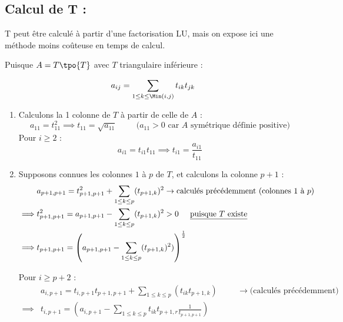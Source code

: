 \subsection*{Calcul de T :}

T peut être calculé à partir d'une factorisation LU, mais on expose ici une méthode moins coûteuse en temps de calcul.

Puisque $A = T \tpo{T}$ avec $T$ triangulaire inférieure :

\[
    a_{ij} = \sum_{1 \leq k \leq \Min(i,j)} t_{ik} t_{jk}
\]

\begin{enumerate}[label=-]
    \item Calculons la 1 colonne de $T$ à partir de celle de $A$ :
        \[
            a_{11} = t_{11}^2 \implies t_{11} = \sqrt{a_{11}} \hspace{1cm} 
            \text{($a_{11} > 0$ car $A$ symétrique définie positive)}
        \]
        Pour $i \geq 2$ :
        \[
            a_{i1} = t_{i1} t_{11} \implies t_{i1} = \frac{a_{i1}}{t_{11}}
        \]
    \item Supposons connues les colonnes $1$ à $p$ de $T$, et calculons la colonne $p+1$ :
        \begin{align*}
            & a_{p+1,p+1} = t_{p+1,p+1}^2 + \sum_{1 \leq k \leq p}(t_{p+1,k})^2 \to
            \text{calculés précédemment (colonnes 1 à $p$)} \\
            \implies & t_{p+1,p+1}^2 = a_{p+1,p+1} - \sum_{1 \leq k \leq p}(t_{p+1,k})^2 > 0 \hspace{0.5cm} \text{\underline{puisque $T$ existe}} \\
            \implies & t_{p+1,p+1} = \left(a_{p+1,p+1} - \sum_{1 \leq k \leq p}(t_{p+1,k})^2)\right)^{\frac{1}{2}}
        \end{align*}

        Pour $i \geq p+2$ :
        \begin{equation*}
            \begin{split}
                & a_{i,p+1} = t_{i,p+1} t_{p+1,p+1} + \sum_{1 \leq k \leq p}(t_{ik} t_{p+1,k})
            \hspace{1cm} \to \text{(calculés précédemment)} \\
                \implies & t_{i,p+1} = (a_{i,p+1} - \sum_{1 \leq k \leq p} t_{ik}t_{p+1,r} \frac{1}{t_{p+1,p+1}})
            \end{split}
        \end{equation*}

\end{enumerate}

